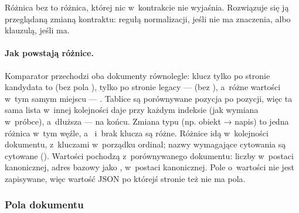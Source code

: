 Różnica bez  to różnica, której nic w~kontrakcie nie wyjaśnia.
Rozwiązuje się ją przeglądaną zmianą kontraktu: regułą normalizacji, jeśli nie ma znaczenia,
albo klauzulą, jeśli ma.

\paragraph{Jak powstają różnice.} Komparator przechodzi oba dokumenty równolegle: klucz tylko
po stronie kandydata to  (bez pola ), tylko po stronie legacy
---  (bez ), a~różne wartości w~tym samym miejscu ---
. Tablice są porównywane pozycja po pozycji, więc ta sama lista w~innej
kolejności daje  przy każdym indeksie (jak wymiana 
w~próbce), a~dłuższa ---  na końcu. Zmiana typu (np. obiekt → napis) to jedna
różnica w~tym węźle, a~ i~brak klucza są różne. Różnice idą w~kolejności
dokumentu, z~kluczami w~porządku ordinal; nazwy wymagające cytowania są cytowane
(). Wartości pochodzą z~porównywanego dokumentu: liczby w~postaci
kanonicznej, adres bazowy jako ,  w~postaci
kanonicznej. Pole o~wartości  nie jest zapisywane, więc wartość JSON
 po którejś stronie też nie ma pola.

\subsubsection{Pola dokumentu}

